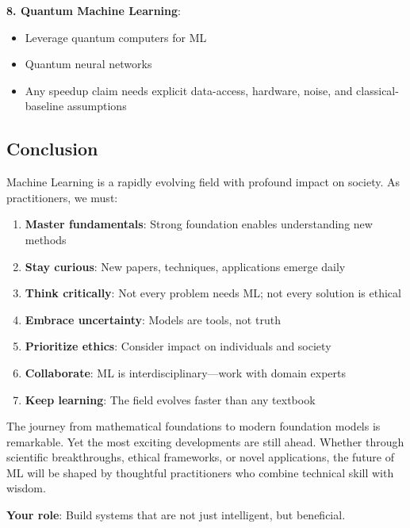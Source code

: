 \documentclass[11pt,twoside]{article}
\numberwithin{equation}{section}
\theoremstyle{plain}
\theoremstyle{definition}
\theoremstyle{remark}
\newenvironment{keyidea}{
  \begin{tcolorbox}[colback=yellow!5!white,
                    colframe=yellow!50!black,
                    title=Key Idea,
                    breakable,
                    enhanced,
                    sharp corners,
                    boxrule=0.8pt,
                    left=6pt, right=6pt, top=6pt, bottom=6pt]
}{
  \end{tcolorbox}
}
\begin{document}
\begin{keyidea}
\textbf{8. Quantum Machine Learning}:
\begin{itemize}
\item Leverage quantum computers for ML
\item Quantum neural networks
\item Any speedup claim needs explicit data-access, hardware, noise, and classical-baseline assumptions
\end{itemize}
\end{keyidea}

\subsection{Conclusion}

\begin{tcolorbox}[colback=green!5!white,colframe=green!75!black,title=Final Thoughts]
Machine Learning is a rapidly evolving field with profound impact on society. As practitioners, we must:

\begin{enumerate}
\item \textbf{Master fundamentals}: Strong foundation enables understanding new methods

\item \textbf{Stay curious}: New papers, techniques, applications emerge daily

\item \textbf{Think critically}: Not every problem needs ML; not every solution is ethical

\item \textbf{Embrace uncertainty}: Models are tools, not truth

\item \textbf{Prioritize ethics}: Consider impact on individuals and society

\item \textbf{Collaborate}: ML is interdisciplinary---work with domain experts

\item \textbf{Keep learning}: The field evolves faster than any textbook
\end{enumerate}

The journey from mathematical foundations to modern foundation models is remarkable. Yet the most exciting developments are still ahead. Whether through scientific breakthroughs, ethical frameworks, or novel applications, the future of ML will be shaped by thoughtful practitioners who combine technical skill with wisdom.

\textbf{Your role}: Build systems that are not just intelligent, but beneficial.
\end{tcolorbox}
\end{document}

